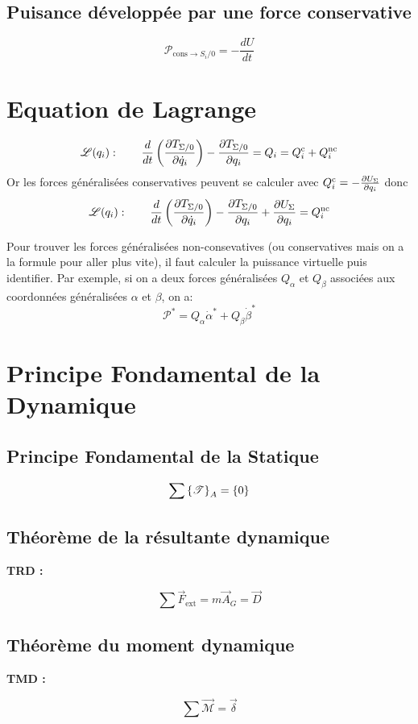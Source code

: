 \documentclass[10pt,a4paper]{article}
\renewcommand{\vec}{\overrightarrow}
\begin{document}
        \subsection*{Puisance développée par une force conservative}
            $$ \mathscr{P}_{\text{cons}\rightarrow S_i/0} = - \frac{dU}{dt} $$


    \clearpage

    \section{Equation de Lagrange}

        $$ \mathscr{L}(q_i): \qquad \frac{d}{dt} \left( \pdv{T_{\Sigma/0}}{\dot{q}_i} \right) - \pdv{T_{\Sigma/0}}{q_i} = Q_i = Q_i^{\text{c}} + Q_i^{\text{nc}} $$
        Or les forces généralisées conservatives peuvent se calculer avec $ Q_i^{\text{c}} = - \pdv{U_{\Sigma}}{q_i} $ donc
        $$ \mathscr{L}(q_i): \qquad \frac{d}{dt} \left( \pdv{T_{\Sigma/0}}{\dot{q}_i} \right) - \pdv{T_{\Sigma/0}}{q_i} + \pdv{U_{\Sigma}}{q_i} = Q_i^{\text{nc}} $$

        Pour trouver les forces généralisées non-consevatives (ou conservatives mais on a la formule pour aller plus vite), il faut calculer la puissance virtuelle puis identifier.
        Par exemple, si on a deux forces généralisées $Q_\alpha$ et $Q_\beta$ associées aux coordonnées généralisées $\alpha$ et $\beta$, on a:
        $$ \mathscr{P}^* = Q_{\alpha} \dot{\alpha}^* + Q_{\beta} \dot{\beta}^* $$

    \section{Principe Fondamental de la Dynamique}


        \subsection*{Principe Fondamental de la Statique}

        \[
        \sum \torseur[A] = \{0\}
        \]

        \subsection*{Théorème de la résultante dynamique}
        \textbf{TRD :}

        \[
        \sum \vec F_{\text{ext}}
        =
        m\vec A_G
        =
        \vec D
        \]

        \subsection*{Théorème du moment dynamique}
        \textbf{TMD :}

        \[
        \sum \vec{\mathcal M}
        =
        \vec\delta
        \]
\end{document}
